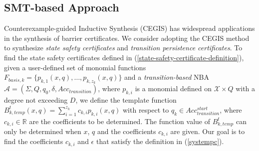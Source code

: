 \documentclass[acmlarge]{acmart}
\begin{document}
\subsection{SMT-based Approach}
Counterexample-guided Inductive Synthesis (CEGIS) \cite{solar2008program} has widespread applications in the synthesis of barrier certificates. We consider adopting the CEGIS method to synthesize \emph{state safety certificates} and \emph{transition persistence certificates}. To find the state safety certificates defined in (\ref{state-safety-certificate-definition}), given a user-defined set of monomial functions $F_{basis, k} = \{p_{k,1}(x, q), \dots, p_{k,z_k}(x,q)\}$ and a \emph{transition-based} NBA $\mathcal{A} = (\Sigma, Q, q_0, \delta, Acc_{transition})$, where $p_{k, i}$ is a monomial defined on $\mathcal{X} \times Q$ with a degree not exceeding $D$, we define the template function $B^t_{k, temp}(x, q) = \sum_{i=1}^{z_k} c_{k, i} p_{k, i}(x, q)$ with respect to $q_k \in Acc_{transition}^{start}$, where $c_{k,i} \in \mathbb{R}$ are the coefficients to be determined. The function value of $B^t_{k, temp}$ can only be determined when $x$, $q$ and the coefficients $c_{k, i}$ are given. Our goal is to find the coefficients $c_{k, i}$ and $\epsilon$ that satisfy the definition in (\ref{systempc}).
\end{document}
